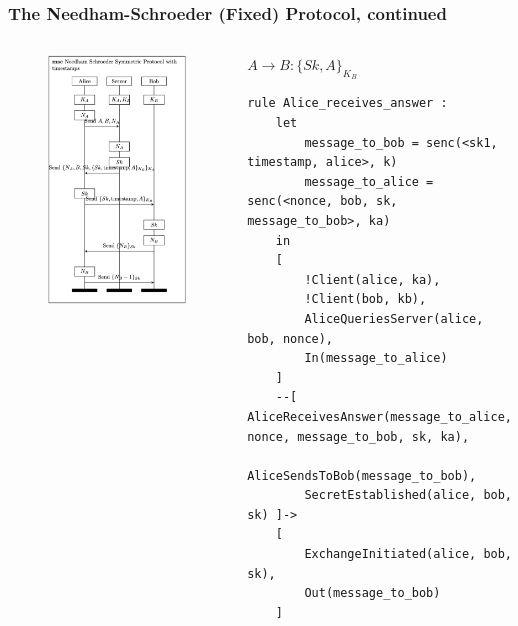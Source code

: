 \documentclass[aspectratio=169,t,xcolor=table]{beamer}
\begin{document}
\begin{frame}[fragile]
    \frametitle{The Needham-Schroeder (Fixed) Protocol, continued}
    \begin{columns}
        \begin{figure}
            \centering
            \includegraphics[width=.8\textwidth]{images/NS_Fixed.png}
        \end{figure}
        \begin{block}{$A \to B: \{Sk, A\}_{K_B}$}
            \begin{lstlisting}[language=Tamarin]
rule Alice_receives_answer :
    let
        message_to_bob = senc(<sk1, timestamp, alice>, k)
        message_to_alice = senc(<nonce, bob, sk, message_to_bob>, ka)
    in
    [
        !Client(alice, ka),
        !Client(bob, kb),
        AliceQueriesServer(alice, bob, nonce),
        In(message_to_alice)
    ]
    --[ AliceReceivesAnswer(message_to_alice, nonce, message_to_bob, sk, ka),
        AliceSendsToBob(message_to_bob),
        SecretEstablished(alice, bob, sk) ]->
    [
        ExchangeInitiated(alice, bob, sk),
        Out(message_to_bob)
    ]\end{lstlisting}
        \end{block}
    \end{columns}
\end{frame}
\end{document}
